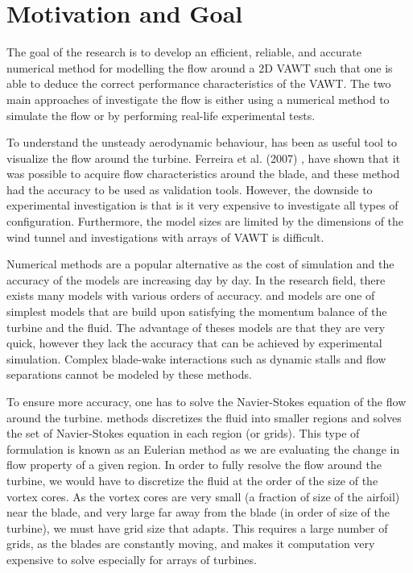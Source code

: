 \section{Motivation and Goal}
The goal of the research is to develop an efficient, reliable, and accurate numerical method for modelling the flow around a 2D VAWT such that one is able to deduce the correct performance characteristics of the VAWT. The two main approaches of investigate the flow is either using a numerical method to simulate the flow or by performing real-life experimental tests.

To understand the unsteady aerodynamic behaviour,  has been as useful tool to visualize the flow around the turbine. Ferreira et al. (2007) \cite{Ferreira2007}, have shown that it was possible to acquire flow characteristics around the blade, and these method had the accuracy to be used as validation tools. However, the downside to experimental investigation is that is it very expensive to investigate all types of configuration. Furthermore, the model sizes are limited by the dimensions of the wind tunnel and investigations with arrays of VAWT is difficult.

Numerical methods are a popular alternative as the cost of simulation and the accuracy of the models are increasing day by day. In the research field, there exists many models with various orders of accuracy.  and  models are one of simplest models that are build upon satisfying the momentum balance of the turbine and the fluid. The advantage of theses models are that they are very quick, however they lack the accuracy that can be achieved by experimental simulation. Complex blade-wake interactions such as dynamic stalls and flow separations cannot be modeled by these methods.

To ensure more accuracy, one has to solve the Navier-Stokes equation of the flow around the turbine.  methods discretizes the fluid into smaller regions and solves the set of Navier-Stokes equation in each region (or grids). This type of formulation is known as an Eulerian method as we are evaluating the change in flow property of a given region. In order to fully resolve the flow around the turbine, we would have to discretize the fluid at the order of the size of the vortex cores. As the vortex cores are very small (a fraction of size of the airfoil) near the blade, and very large far away from the blade (in order of size of the turbine), we must have grid size that adapts. This requires a large number of grids, as the blades are constantly  moving, and makes it computation very expensive to solve especially for arrays of turbines.


